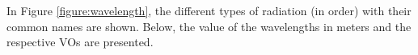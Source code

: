 In Figure \ref{figure:wavelength}, the different types of
radiation (in order) with their common names are shown. Below, the value of
the wavelengths in meters and the respective VOs are presented. 

